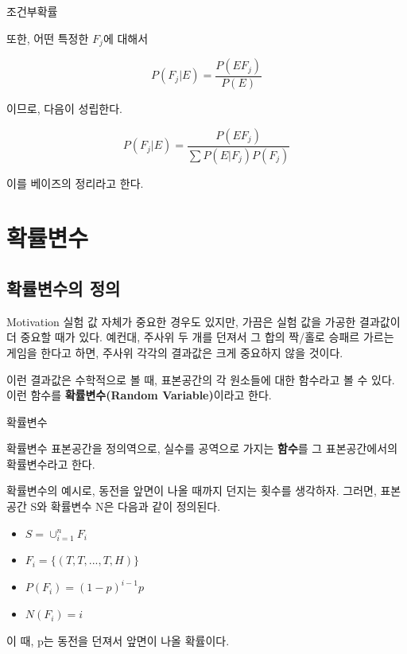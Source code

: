 \documentclass{beamer}
\begin{document}
\begin{frame}[allowframebreaks]{조건부확률}
\framebreak

또한, 어떤 특정한 $F_j$에 대해서 

\begin{equation} 
P(F_j|E) = \frac{P(EF_j)}{P(E)}
\end{equation}

이므로, 다음이 성립한다. 

\begin{equation} 
P(F_j|E) = \frac{P(EF_j)}{ \sum P(E|F_j)P(F_j)}
\end{equation}

이를 베이즈의 정리라고 한다. 

\end{frame}





\section{확률변수} 


\subsection{확률변수의 정의} 
 
\begin{frame}{Motivation}
실험 값 자체가 중요한 경우도 있지만, 가끔은 실험 값을 가공한 결과값이 더 중요할 때가 있다. 예컨대, 주사위 두 개를 던져서 그 합의 짝/홀로 승패르 가르는 게임을 한다고 하면, 주사위 각각의 결과값은 크게 중요하지 않을 것이다. 

이런 결과값은 수학적으로 볼 때, 표본공간의 각 원소들에 대한 함수라고 볼 수 있다. 이런 함수를 \textbf{확률변수(Random Variable)}이라고 한다. 
\end{frame}
 

\begin{frame}[allowframebreaks]{확률변수}

\begin{block}{확률변수}
표본공간을 정의역으로, 실수를 공역으로 가지는 \textbf{함수}를 그 표본공간에서의 확률변수라고 한다. 
\end{block}

확률변수의 예시로, 동전을 앞면이 나올 때까지 던지는 횟수를 생각하자. 그러면, 표본공간 S와 확률변수 N은 다음과 같이 정의된다. 

\begin{itemize} 
\item $S = \cup_{i=1}^n F_i$ 
\item $F_i = \{(T, T, ..., T, H)\}$ 
\item $P(F_i) = (1-p)^{i-1} p$ 
\item $N(F_i) = i$ 
\end{itemize}

이 때, p는 동전을 던져서 앞면이 나올 확률이다. 
\end{frame}
\end{document}
